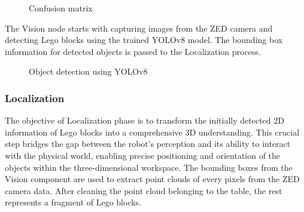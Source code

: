 \documentclass{article}
\begin{document}
	\begin{figure}[H]
		\centering
		\caption{Confusion matrix}
		\label{fig:confusion_matrix}
	\end{figure}
	
	The Vision node starts with capturing images from the ZED camera and detecting Lego blocks using the trained YOLOv8 model. The bounding box information for detected objects is passed to the Localization process.
	
	\begin{figure}[H]
		\centering
		\caption{Object detection using YOLOv8}
		\label{fig:detect}
	\end{figure}
	
	\subsubsection{Localization}
	The objective of Localization phase is to transform the initially detected 2D information of Lego blocks into a comprehensive 3D understanding. This crucial step bridges the gap between the robot's perception and its ability to interact with the physical world, enabling precise positioning and orientation of the objects within the three-dimensional workspace. The bounding boxes from the Vision component are used to extract point clouds of every pixels from the ZED camera data. After cleaning the point cloud belonging to the table, the rest represents a fragment of Lego blocks.
	
\end{document}
